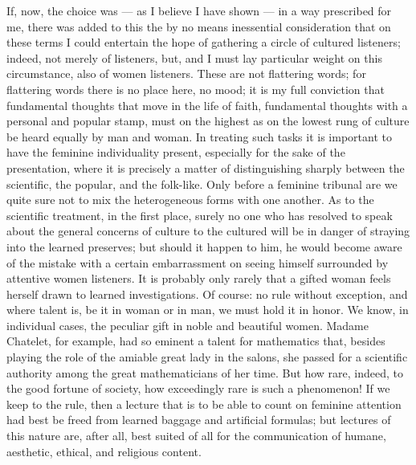 \documentclass[12pt]{book}
\newcommand{\opage}[1]{\marginnote{\footnotesize\textit{[#1]}}}
\begin{document}
If, now, the choice was --- as I believe I have shown --- in a way
prescribed for me, there was added to this the by no means inessential
consideration that on these terms I could entertain the hope of gathering
a circle of cultured listeners; indeed, not merely of listeners, but,
and I must lay particular weight on this circumstance, also of women
listeners. These are not flattering words; for flattering words there is
no place here, no mood; it is my full conviction that fundamental
thoughts that move in the life of faith, fundamental thoughts with a
personal and popular stamp, must on the highest as on the lowest rung of
culture be heard equally by man and woman. In treating such tasks it is
important to have the feminine individuality present, especially for the
sake of the presentation, where it is precisely a matter of distinguishing
sharply between the scientific, the popular, and the folk-like. Only
before a feminine tribunal are we quite sure not to mix the heterogeneous
forms with one another. As to the scientific treatment, in the first
place, surely no one who has resolved to speak about the general concerns
of culture to the cultured will be in danger of straying into the learned
preserves; but should it happen to him, he would become aware of the
mistake with a certain embarrassment on seeing himself surrounded by
attentive women listeners. It is probably only rarely that a gifted woman
feels herself drawn to learned investigations. Of course: no rule without
exception, and where talent is, be it in woman or in man, we must hold it
in honor. We know, in individual cases, the peculiar
\opage{284}\setcounter{footnote}{0}%
gift in noble and beautiful women. Madame Chatelet, for example, had so
eminent a talent for mathematics that, besides playing the role of the
amiable great lady in the salons, she passed for a scientific authority
among the great mathematicians of her time. But how rare, indeed, to the
good fortune of society, how exceedingly rare is such a phenomenon! If we
keep to the rule, then a lecture that is to be able to count on feminine
attention had best be freed from learned baggage and artificial formulas;
but lectures of this nature are, after all, best suited of all for the
communication of humane, aesthetic, ethical, and religious content.
\end{document}
